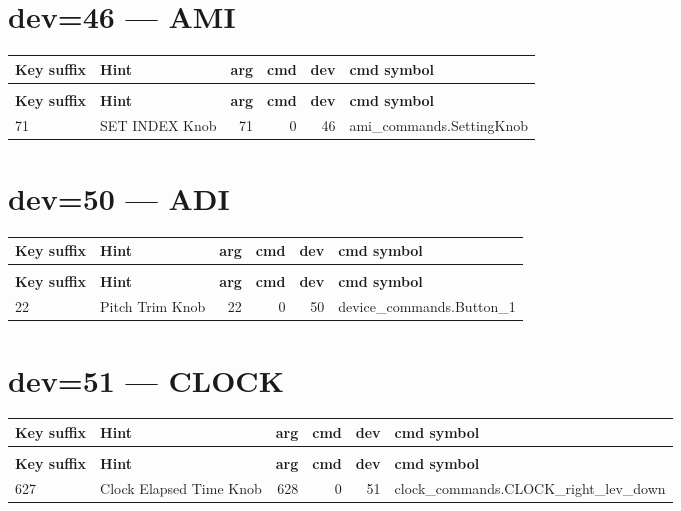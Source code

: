 \documentclass[10pt,a4paper]{article}
\begin{document}
\section{dev=46 — AMI}
\begin{longtable}{>{\ttfamily\small}p{38mm} >{\small}p{72mm} r r r >{\ttfamily\small}p{48mm}}
\toprule
\textbf{Key suffix} & \textbf{Hint} & \textbf{arg} & \textbf{cmd} & \textbf{dev} & \textbf{cmd symbol} \\
\midrule
\endfirsthead
\multicolumn{6}{l}{\small\itshape continued\ldots}\\
\toprule
\textbf{Key suffix} & \textbf{Hint} & \textbf{arg} & \textbf{cmd} & \textbf{dev} & \textbf{cmd symbol} \\
\midrule
\endhead
\bottomrule
\endfoot
\rowcolor{rowodd}
  71 & SET INDEX Knob & 71 & 0 & 46 & ami\_commands.SettingKnob \\
\end{longtable}
\section{dev=50 — ADI}
\begin{longtable}{>{\ttfamily\small}p{38mm} >{\small}p{72mm} r r r >{\ttfamily\small}p{48mm}}
\toprule
\textbf{Key suffix} & \textbf{Hint} & \textbf{arg} & \textbf{cmd} & \textbf{dev} & \textbf{cmd symbol} \\
\midrule
\endfirsthead
\multicolumn{6}{l}{\small\itshape continued\ldots}\\
\toprule
\textbf{Key suffix} & \textbf{Hint} & \textbf{arg} & \textbf{cmd} & \textbf{dev} & \textbf{cmd symbol} \\
\midrule
\endhead
\bottomrule
\endfoot
\rowcolor{rowodd}
  22 & Pitch Trim Knob & 22 & 0 & 50 & device\_commands.Button\_1 \\
\end{longtable}
\section{dev=51 — CLOCK}
\begin{longtable}{>{\ttfamily\small}p{38mm} >{\small}p{72mm} r r r >{\ttfamily\small}p{48mm}}
\toprule
\textbf{Key suffix} & \textbf{Hint} & \textbf{arg} & \textbf{cmd} & \textbf{dev} & \textbf{cmd symbol} \\
\midrule
\endfirsthead
\multicolumn{6}{l}{\small\itshape continued\ldots}\\
\toprule
\textbf{Key suffix} & \textbf{Hint} & \textbf{arg} & \textbf{cmd} & \textbf{dev} & \textbf{cmd symbol} \\
\midrule
\endhead
\bottomrule
\endfoot
\rowcolor{rowodd}
  627 & Clock Elapsed Time Knob & 628 & 0 & 51 & clock\_commands.CLOCK\_right\_lev\_down \\
\end{longtable}
\end{document}
